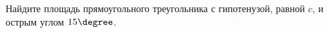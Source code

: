 \begin{ex}
	\begin{condition}
		Найдите площадь прямоугольного треугольника с гипотенузой, равной \( c \), и острым углом \( 15\degree \).
	\end{condition}
\end{ex}